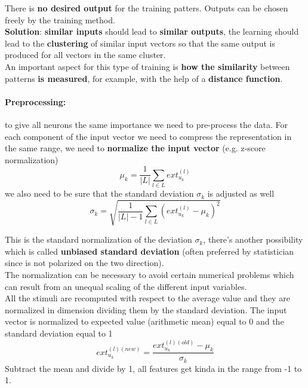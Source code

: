 There is \textbf{no desired output} for the training patters. Outputs can be chosen freely by the training method.\\

\textbf{Solution}: \textbf{similar inputs} should lead to \textbf{similar outputs}, the learning should lead to the \textbf{clustering} of similar input vectors so that the same output is produced for all vectors in the same cluster.\\

An important aspect for this type of training is \textbf{how the similarity} between patterns \textbf{is measured}, for example, with the help of a \textbf{distance function}. \\

\paragraph{Preprocessing:} to give all neurons the same importance we need to pre-process the data. For each component of the input vector we need to compress the representation in the same range, we need to \textbf{normalize the input vector} (e.g. z-score normalization)
$$ \mu_k = \frac{1}{|L|} \sum_{l \in L} ext_{u_k}^{(l)}$$
we also need to be sure that the standard deviation $\sigma_k$ is adjusted as well
$$ \sigma_k = \sqrt{\frac{1}{|L| - 1} \sum_{l \in L} \left(ext_{u_k}^{(l)} - \mu_k \right)^2}$$

This is the standard normalization of the deviation $\sigma_k$, there's another possibility which is called \textbf{unbiased standard deviation} (often preferred by statistician since is not polarized on the two direction).\\

The normalization can be necessary to avoid certain numerical problems which can result from an unequal scaling of the different input variables.\\

All the stimuli are recomputed with respect to the average value and they are normalized in dimension dividing them by the standard deviation. The input vector is normalized to expected value (arithmetic mean) equal to 0 and the standard deviation equal to 1
$$ ext_{u_k}^{(l)(new)} = \frac{ext_{u_k}^{(l)(old)} - \mu_k}{\sigma_k} $$
Subtract the mean and divide by 1, all features get kinda in the range from -1 to 1.\\


